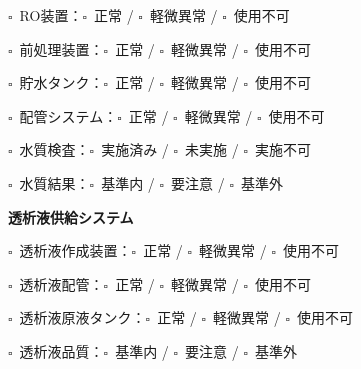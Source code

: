 \documentclass[a4paper,12pt]{jarticle}
\newcommand{\checkbox}{$\square$\ }
\begin{document}
\noindent
\checkbox RO装置：\quad \checkbox 正常 \quad / \quad \checkbox 軽微異常 \quad / \quad \checkbox 使用不可

\vspace{2mm}

\noindent
\checkbox 前処理装置：\quad \checkbox 正常 \quad / \quad \checkbox 軽微異常 \quad / \quad \checkbox 使用不可

\vspace{2mm}

\noindent
\checkbox 貯水タンク：\quad \checkbox 正常 \quad / \quad \checkbox 軽微異常 \quad / \quad \checkbox 使用不可

\vspace{2mm}

\noindent
\checkbox 配管システム：\quad \checkbox 正常 \quad / \quad \checkbox 軽微異常 \quad / \quad \checkbox 使用不可

\vspace{2mm}

\noindent
\checkbox 水質検査：\quad \checkbox 実施済み \quad / \quad \checkbox 未実施 \quad / \quad \checkbox 実施不可

\vspace{2mm}

\noindent
\checkbox 水質結果：\quad \checkbox 基準内 \quad / \quad \checkbox 要注意 \quad / \quad \checkbox 基準外

\vspace{8mm}

\begin{center}
\textbf{\large 透析液供給システム}
\end{center}

\vspace{3mm}

\noindent
\checkbox 透析液作成装置：\quad \checkbox 正常 \quad / \quad \checkbox 軽微異常 \quad / \quad \checkbox 使用不可

\vspace{2mm}

\noindent
\checkbox 透析液配管：\quad \checkbox 正常 \quad / \quad \checkbox 軽微異常 \quad / \quad \checkbox 使用不可

\vspace{2mm}

\noindent
\checkbox 透析液原液タンク：\quad \checkbox 正常 \quad / \quad \checkbox 軽微異常 \quad / \quad \checkbox 使用不可

\vspace{2mm}

\noindent
\checkbox 透析液品質：\quad \checkbox 基準内 \quad / \quad \checkbox 要注意 \quad / \quad \checkbox 基準外
\end{document}

